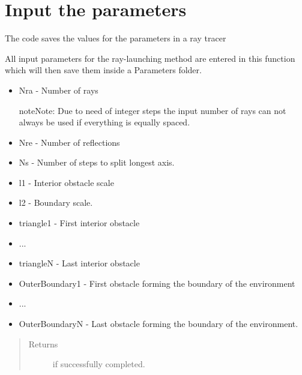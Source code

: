 \documentclass[letterpaper,10pt,english]{sphinxmanual}
\begin{document}
\chapter{Input the parameters}
\label{index:input-the-parameters}\label{index:module-ParameterInput}
The code saves the values for the parameters in a ray tracer

\begin{fulllineitems}
\label{index:ParameterInput.DeclareParameters}
All input parameters for the ray-launching method are entered in
this function which will then save them inside a Parameters folder.
\begin{itemize}
\item {} 
Nra - Number of rays

\begin{notice}{note}{Note:}
Due to need of integer steps the input number of rays can not
always be used if everything is equally spaced.
\end{notice}

\item {} 
Nre - Number of reflections

\item {} 
Ns - Number of steps to split longest axis.

\item {} 
l1 - Interior obstacle scale

\item {} 
l2 - Boundary scale.

\item {} 
triangle1 - First interior obstacle

\item {} 
...

\item {} 
triangleN - Last interior obstacle

\item {} 
OuterBoundary1 - First obstacle forming the boundary of the   environment

\item {} 
...

\item {} 
OuterBoundaryN - Last obstacle forming the boundary of the   environment.

\end{itemize}
\begin{quote}\begin{description}
\item[{Returns}]  if successfully completed.

\end{description}\end{quote}

\end{fulllineitems}
\end{document}

